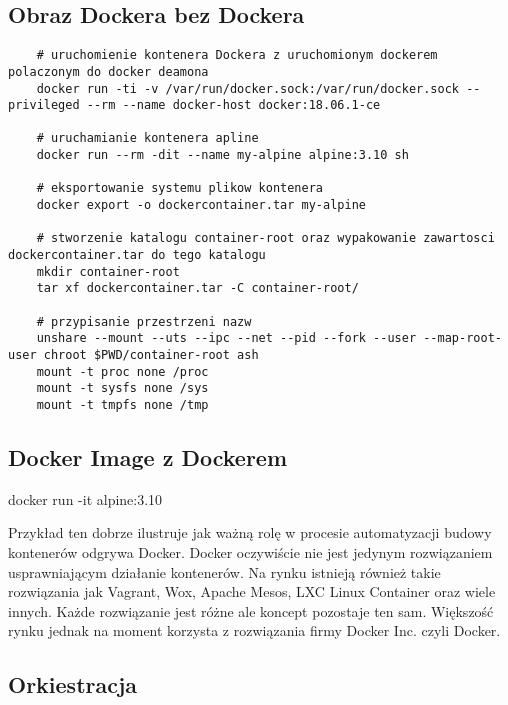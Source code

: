 \subsection{Obraz Dockera bez Dockera}
\begin{lstlisting}
    # uruchomienie kontenera Dockera z uruchomionym dockerem polaczonym do docker deamona
    docker run -ti -v /var/run/docker.sock:/var/run/docker.sock --privileged --rm --name docker-host docker:18.06.1-ce

    # uruchamianie kontenera apline 
    docker run --rm -dit --name my-alpine alpine:3.10 sh

    # eksportowanie systemu plikow kontenera
    docker export -o dockercontainer.tar my-alpine

    # stworzenie katalogu container-root oraz wypakowanie zawartosci dockercontainer.tar do tego katalogu
    mkdir container-root
    tar xf dockercontainer.tar -C container-root/

    # przypisanie przestrzeni nazw
    unshare --mount --uts --ipc --net --pid --fork --user --map-root-user chroot $PWD/container-root ash 
    mount -t proc none /proc
    mount -t sysfs none /sys
    mount -t tmpfs none /tmp

\end{lstlisting}

\subsection{Docker Image z Dockerem}
docker run -it alpine:3.10

Przykład ten dobrze ilustruje jak ważną rolę w procesie automatyzacji budowy kontenerów odgrywa Docker.
Docker oczywiście nie jest jedynym rozwiązaniem usprawniającym działanie kontenerów. Na rynku istnieją również takie rozwiązania jak Vagrant, Wox, Apache Mesos, LXC Linux Container oraz wiele innych. Każde rozwiązanie jest różne ale koncept pozostaje ten sam. Większość rynku jednak na moment korzysta z rozwiązania firmy Docker Inc. czyli Docker.

\subsection{Orkiestracja}

